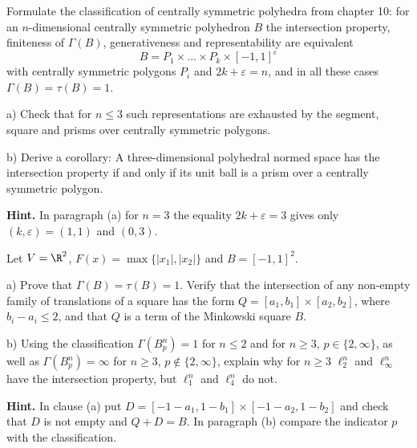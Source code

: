 \documentclass[a4paper,12pt]{report}
\begin{document}
\begin{task}
Formulate the classification of centrally symmetric polyhedra from chapter \textup{10}\textup{:} for an $n$-dimensional centrally symmetric polyhedron $B$ the intersection property, finiteness of $\Gamma(B)$, generativeness and representability are equivalent
\[
B=P_1\times\dots\times P_k\times[-1,1]^\varepsilon
\]
with centrally symmetric polygons $P_i$ and $2k+\varepsilon=n$, and in all these cases $\Gamma(B)=\tau(B)=1$.

\textup{a)} Check that for $n\le3$ such representations are exhausted by the segment, square and prisms over centrally symmetric polygons.

\textup{b)} Derive a corollary\textup{:} A three-dimensional polyhedral normed space has the intersection property if and only if its unit ball is a prism over a centrally symmetric polygon.

\textbf{Hint.} In paragraph \textup{(a)} for $n=3$ the equality $2k+\varepsilon=3$ gives only $(k,\varepsilon)=(1,1)$ and $(0,3)$.
\end{task}

\begin{task}
Let $V=\R^2$, $F(x)=\max\{|x_1|,|x_2|\}$ and $B=[-1,1]^2$.

\textup{a)} Prove that $\Gamma(B)=\tau(B)=1$. Verify that the intersection of any non-empty family of translations of a square has the form $Q=[a_1,b_1]\times[a_2,b_2]$, where $b_i-a_i\le2$, and that $Q$ is a term of the Minkowski square $B$.

\textup{b)} Using the classification $\Gamma(B_p^n)=1$ for $n\le2$ and for $n\ge3$, $p\in\{2,\infty\}$, as well as $\Gamma(B_p^n)=\infty$ for $n\ge3$, $p\notin\{2,\infty\}$, explain why for $n\ge3$ $\ell_2^n$ and $\ell_\infty^n$ have the intersection property, but $\ell_1^n$ and $\ell_4^n$ do not.

\textbf{Hint.} In clause \textup{(a)} put $D=[-1-a_1,1-b_1]\times[-1-a_2,1-b_2]$ and check that $D$ is not empty and $Q+D=B$. In paragraph \textup{(b)} compare the indicator $p$ with the classification.
\end{task}
\end{document}
